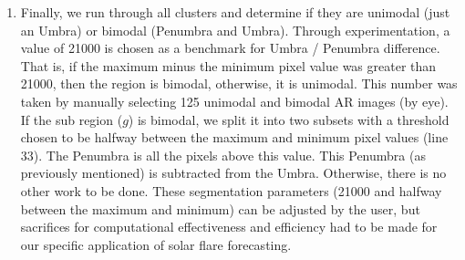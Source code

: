 \documentclass[defaultstyle,11pt]{thesis}
\begin{document}
\begin{enumerate}
    
    \item Finally, we run through all clusters and determine if they are unimodal (just an Umbra) or bimodal (Penumbra and Umbra). Through experimentation, a value of 21000 is chosen as a benchmark for Umbra / Penumbra difference. That is, if the maximum minus the minimum pixel value was greater than 21000, then the region is bimodal, otherwise, it is unimodal. This number was taken by manually selecting 125 unimodal and bimodal AR images (by eye). If the sub region ($g$) is bimodal, we split it into two subsets with a threshold chosen to be halfway between the maximum and minimum pixel values (line 33). The Penumbra is all the pixels above this value. This Penumbra (as previously mentioned) is subtracted from the Umbra. Otherwise, there is no other work to be done. These segmentation parameters (21000 and halfway between the maximum and minimum) can be adjusted by the user, but sacrifices for computational effectiveness and efficiency had to be made for our specific application of solar flare forecasting.
    

\end{enumerate}
\end{document}
